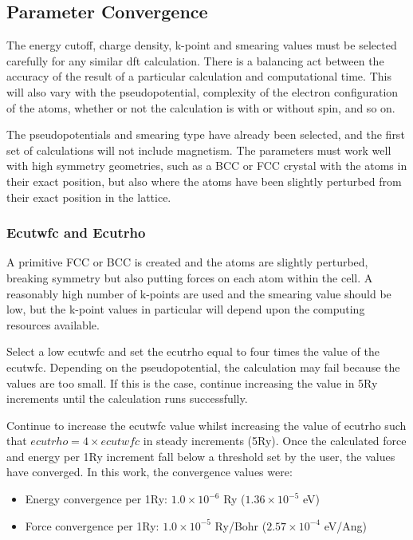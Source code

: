 \subsection{Parameter Convergence}

The energy cutoff, charge density, k-point and smearing values must be selected carefully for any similar \acrshort{dft} calculation.  There is a balancing act between the accuracy of the result of a particular calculation and computational time.  This will also vary with the pseudopotential, complexity of the electron configuration of the atoms, whether or not the calculation is with or without spin, and so on.

The pseudopotentials and smearing type have already been selected, and the first set of calculations will not include magnetism.  The parameters must work well with high symmetry geometries, such as a BCC or FCC crystal with the atoms in their exact position, but also where the atoms have been slightly perturbed from their exact position in the lattice.

\subsubsection{Ecutwfc and Ecutrho}

A primitive FCC or BCC is created and the atoms are slightly perturbed, breaking symmetry but also putting forces on each atom within the cell.  A reasonably high number of k-points are used and the smearing value should be low, but the k-point values in particular will depend upon the computing resources available.

Select a low ecutwfc and set the ecutrho equal to four times the value of the ecutwfc.  Depending on the pseudopotential, the calculation may fail because the values are too small.  If this is the case, continue increasing the value in 5Ry increments until the calculation runs successfully.

Continue to increase the ecutwfc value whilst increasing the value of ecutrho such that $ecutrho = 4 \times ecutwfc$ in steady increments (5Ry).  Once the calculated force and energy per 1Ry increment fall below a threshold set by the user, the values have converged.  In this work, the convergence values were:

\begin{itemize}
\item Energy convergence per 1Ry: $1.0 \times 10^{-6}$ Ry ($1.36 \times 10^{-5}$ eV)
\item Force convergence per 1Ry: $1.0 \times 10^{-5}$ Ry/Bohr ($2.57 \times 10^{-4}$ eV/Ang)
\end{itemize}

